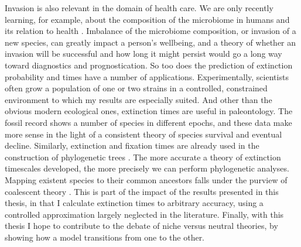 Invasion is also relevant in the domain of health care. 
We are only recently learning, for example, about the composition of the microbiome in humans and its relation to health \cite{Coburn2015,Korem2015,Manichanh2010,Theriot2014,Kinross2011}. 
Imbalance of the microbiome composition, or invasion of a new species, can greatly impact a person's wellbeing, and a theory of whether an invasion will be successful and how long it might persist would go a long way toward diagnostics and prognostication.
So too does the prediction of extinction probability and times have a number of applications. 
Experimentally, scientists often grow a population of one or two strains in a controlled, constrained environment to which my results are especially suited. 
And other than the obvious modern ecological ones, extinction times are useful in paleontology. 
The fossil record shows a number of species in different epochs, and these data make more sense in the light of a consistent theory of species survival and eventual decline. %
Similarly, extinction and fixation times are already used in the construction of phylogenetic trees \cite{Rogers2014,Rice2004,Blythe2007}. 
The more accurate a theory of extinction timescales developed, the more precisely we can perform phylogenetic analyses. 
Mapping existent species to their common ancestors falls under the purview of coalescent theory \cite{Kingman1982}. %
This is part of the impact of the results presented in this thesis, in that I calculate extinction times to arbitrary accuracy, using a controlled approximation largely neglected in the literature. %
Finally, with this thesis I hope to contribute to the debate of niche versus neutral theories, by showing how a model transitions from one to the other. 





